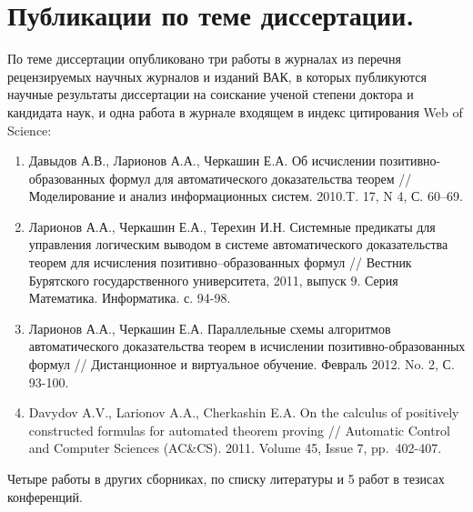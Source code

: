 \section*{Публикации по теме диссертации.} По теме диссертации опубликовано три работы в журналах из перечня рецензируемых научных журналов и изданий ВАК, в которых публикуются научные результаты диссертации на соискание ученой степени доктора и кандидата наук, и одна работа в журнале входящем в индекс цитирования Web of Science:
\begin{enumerate}
\item Давыдов А.В., Ларионов А.А., Черкашин Е.А. Об исчислении позитивно-образованных формул для автоматического доказательства теорем // Моделирование и анализ информационных систем. 2010.T. 17, N 4, С. 60--69.
\item Ларионов А.А., Черкашин Е.А., Терехин И.Н. Системные предикаты для управления логическим выводом в системе автоматического доказательства теорем для исчисления позитивно--образованных формул // Вестник Бурятского государственного университета, 2011, выпуск 9. Серия Математика. Информатика. с. 94-98.
\item Ларионов А.А., Черкашин Е.А. Параллельные схемы алгоритмов автоматического доказательства теорем в исчислении
позитивно-образованных формул // Дистанционное и виртуальное обучение. Февраль 2012. No. 2, С. 93-100.
\item Davydov A.V., Larionov A.A., Cherkashin E.A. On the calculus of positively constructed formulas for automated theorem proving // Automatic Control and Computer Sciences (AC\&CS). 2011. Volume 45, Issue 7, pp.~402-407.
\end{enumerate}

Четыре работы в других сборниках, по списку литературы \cite{viner, QUANT4, mipro, semver} и 5 работ в тезисах конференций.



